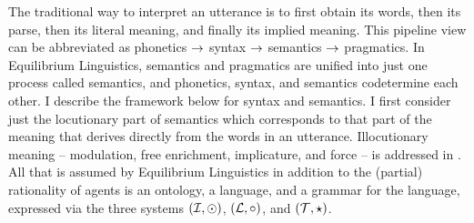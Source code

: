 The traditional way to interpret an utterance is to first obtain its words, then its parse, then its literal meaning, and finally its implied meaning. This pipeline view  can be abbreviated as phonetics $\rightarrow$ syntax $\rightarrow$ semantics 
$\rightarrow$ pragmatics. In Equilibrium Linguistics, semantics and pragmatics are unified into just one process called semantics, and phonetics, syntax, and semantics codetermine each other. I describe the framework below for syntax and semantics. I first consider just the locutionary part of semantics which corresponds to that part of the meaning that derives directly from the words in an utterance. Illocutionary meaning -- modulation, free enrichment, implicature, and force -- is addressed in . All that is assumed by Equilibrium Linguistics in addition to the (partial) rationality of agents is an ontology, a language, and a grammar for the language, expressed via the three systems $({\cal I}, \odot)$, $({\cal L}, \circ)$, and $({\cal T}, \star)$.

